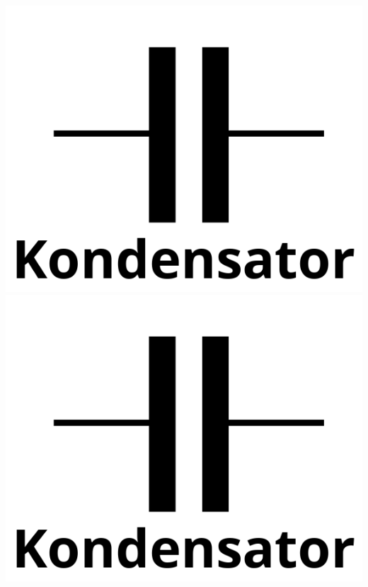 \documentclass{scrartcl}
\begin{document}
{\begin{minipage}{\textwidth}
			\includegraphics[scale=0.15]{capa.png}
			\includegraphics[scale=0.15]{capa.png}\\
		\end{minipage}
	}
\end{document}
